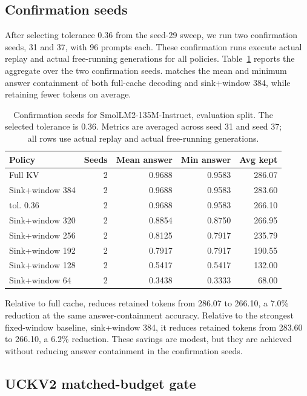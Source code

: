 \subsection{Confirmation seeds}

After selecting tolerance 0.36 from the seed-29 sweep, we run two confirmation seeds, 31 and 37, with 96 prompts each. These confirmation runs execute actual replay and actual free-running generations for all policies. Table~\ref{tab:final-confirm} reports the aggregate over the two confirmation seeds. \uckv{} matches the mean and minimum answer containment of both full-cache decoding and sink+window 384, while retaining fewer tokens on average.

\begin{table}[t]
\centering
\small
\caption{Confirmation seeds for SmolLM2-135M-Instruct, evaluation split. The selected \uckv{} tolerance is 0.36. Metrics are averaged across seed 31 and seed 37; all rows use actual replay and actual free-running generations.}
\label{tab:final-confirm}
\begin{tabular}{lrrrr}
\toprule
Policy & Seeds & Mean answer & Min answer & Avg kept \\
\midrule
Full KV & 2 & 0.9688 & 0.9583 & 286.07 \\
Sink+window 384 & 2 & 0.9688 & 0.9583 & 283.60 \\
\uckv{} tol. 0.36 & 2 & 0.9688 & 0.9583 & 266.10 \\
Sink+window 320 & 2 & 0.8854 & 0.8750 & 266.95 \\
Sink+window 256 & 2 & 0.8125 & 0.7917 & 235.79 \\
Sink+window 192 & 2 & 0.7917 & 0.7917 & 190.55 \\
Sink+window 128 & 2 & 0.5417 & 0.5417 & 132.00 \\
Sink+window 64 & 2 & 0.3438 & 0.3333 & 68.00 \\
\bottomrule
\end{tabular}
\end{table}

Relative to full cache, \uckv{} reduces retained tokens from 286.07 to 266.10, a 7.0\% reduction at the same answer-containment accuracy. Relative to the strongest fixed-window baseline, sink+window 384, it reduces retained tokens from 283.60 to 266.10, a 6.2\% reduction. These savings are modest, but they are achieved without reducing answer containment in the confirmation seeds.

\subsection{UCKV2 matched-budget gate}

